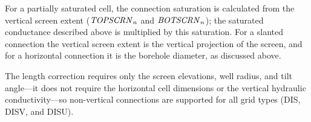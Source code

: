 For a partially saturated cell, the connection saturation is calculated from the vertical screen extent ($\mathit{TOPSCRN}_n$ and $\mathit{BOTSCRN}_n$); the saturated conductance described above is multiplied by this saturation. For a slanted connection the vertical screen extent is the vertical projection of the screen, and for a horizontal connection it is the borehole diameter, as discussed above.

The length correction requires only the screen elevations, well radius, and tilt angle---it does not require the horizontal cell dimensions or the vertical hydraulic conductivity---so non-vertical connections are supported for all grid types (DIS, DISV, and DISU).
